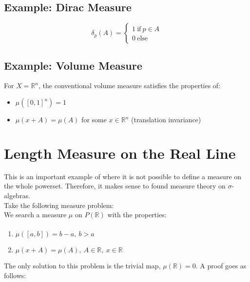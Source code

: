 \subsection{Example: Dirac Measure}
\begin{equation}
\delta_p(A) = \left\{\begin{array}{l} 1 \mathrm{\ if\ }p\in A\\ 0 \mathrm{\ else} \end{array}\right.
\end{equation}

\subsection{Example: Volume Measure}
For $X=\mathbb{R}^n$, the conventional volume measure satisfies the properties of:

\begin{itemize}
\item $\mu([0,1]^n) = 1$
\item $\mu(x + A) = \mu(A)$ for some $x\in \mathbb{R}^n$ (translation invariance)
\end{itemize}



\section{Length Measure on the Real Line}

This is an important example of where it is not possible to define a measure on the whole powerset. Therefore, it makes sense to found measure theory on $\sigma$-algebras.\\

Take the following measure problem:\\

We search a measure $\mu$ on $P(\mathbb{R})$ with the properties:

\paragraph{}
\begin{enumerate}
\item $\mu([a,b]) = b-a,\ b>a$
\item $\mu(x+A) = \mu(A),\ A\in\mathbb{R},\ x\in\mathbb{R}$	 
\end{enumerate}

The only solution to this problem is the trivial map, $\mu(\mathbb{R}) = 0$. A proof goes as follows:

